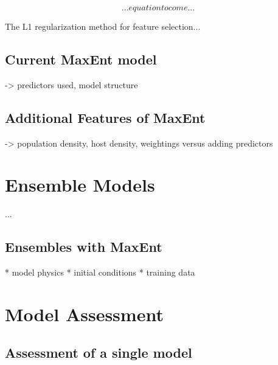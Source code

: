 \begin{equation}
... equation to come ...
\end{equation}


\noindent The L1 regularization method for feature selection... \newline

\subsection{Current MaxEnt model}

-> predictors used, model structure \newline


\subsection{Additional Features of MaxEnt}

-> population density, \newline host density, \newline weightings versus adding predictors \newline




\section{Ensemble Models}


 ...\newline

\subsection{Ensembles with MaxEnt}
* model physics \newline
* initial conditions\newline
* training data \newline



\section{Model Assessment }

\subsection{Assessment of a single model}

